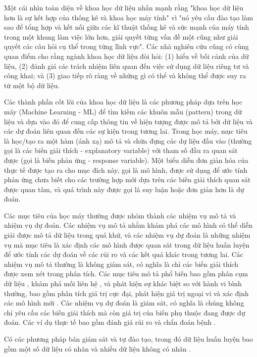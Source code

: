 \documentclass[utf8]{frontiersSCNS} %
\begin{document}
Một cái nhìn toàn diện về khoa học dữ liệu nhấn mạnh rằng "khoa học dữ liệu hơn là sự kết hợp của thống kê và khoa học máy tính" vì "nó yêu cầu đào tạo làm sao để tổng hợp và kết nối giữa các kĩ thuật thống kê và sức mạnh của máy tính trong một khung làm việc lớn hơn, giải quyết từng vấn đề một cũng như giải quyết các câu hỏi cụ thể trong từng lĩnh vực". Các nhà nghiên cứu cũng có cùng quan điểm cho rằng ngành khoa học dữ liệu đòi hỏi: (1) hiểu về bối cảnh của dữ liệu, (2) đánh giá các trách nhiệm liên quan đến việc sử dụng dữ liệu riêng tư và công khai; và (3) giao tiếp rõ ràng về những gì có thể và không thể được suy ra từ một bộ dữ liệu.

Các thành phần cốt lõi của khoa học dữ liệu là các phương pháp dựa trên học máy (Machine Learning - ML) để tìm kiếm các khuôn mẫu (pattern) trong dữ liệu và dựa vào đó để cung cấp thông tin về hiện tượng được mô tả bởi dữ liệu và các dự đoán liên quan đến các sự kiện trong tương lai. Trong học máy, mục tiêu là học/tạo ra một hàm (ánh xạ) mô tả và chứa đựng các dự liệu đầu vào (thường gọi là các biến giải thích - explanatory variable) với tham số đầu ra quan sát được (gọi là biến phản ứng - response variable). Một biểu diễn đơn giản hóa của thực tế được tạo ra cho mục đích này, gọi là mô hình, được sử dụng để ước tính phản ứng chưa biết cho các trường hợp mới dựa trên các biến giải thích quan sát được quan tâm, và quá trình này được gọi là suy luận hoặc đơn giản hơn là dự đoán.

Các mục tiêu của học máy thường được nhóm thành các nhiệm vụ mô tả và nhiệm vụ dự đoán. Các nhiệm vụ mô tả nhằm khám phá các mô hình có thể diễn giải được mô tả dữ liệu trong quá khứ, và các nhiệm vụ dự đoán là những nhiệm vụ mà mục tiêu là xác định các mô hình được quan sát trong dữ liệu huấn luyện để ước tính các dự đoán về các rủi ro và các kết quả khác trong tương lai. Các nhiệm vụ mô tả thường là không giám sát, có nghĩa là chỉ các biến giải thích được xem xét trong phân tích. Các mục tiêu mô tả phổ biến bao gồm phân cụm dữ liệu \citep{Albarakati2019, Gligorijevic2016}, khám phá mối liên hệ \citep{Gligorijevic2016a}, và phát hiện sự khác biệt so với hành vi bình thường, bao gồm phân tích giá trị cực đại, phát hiện giá trị ngoại vi và xác định các mô hình mới \citep{Tan2016}. Các nhiệm vụ dự đoán là giám sát, có nghĩa là chúng không chỉ yêu cầu các biến giải thích mà còn giá trị của biến phụ thuộc đang được dự đoán. Các ví dụ thực tế bao gồm đánh giá rủi ro và chẩn đoán bệnh \citep{Ghalwash2013}.

Có các phương pháp bán giám sát và tự đào tạo, trong đó dữ liệu huấn luyện bao gồm một số dữ liệu có nhãn và nhiều dữ liệu không có nhãn \citep{Triguero2015}.
\end{document}
